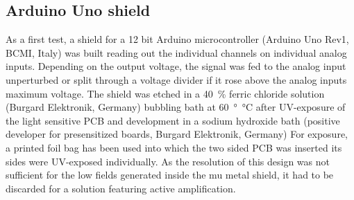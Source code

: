         \subsection{Arduino Uno shield}
        As a first test, a shield for a 12 bit Arduino microcontroller (Arduino Uno Rev1, BCMI, Italy) was built reading out the individual channels on individual analog inputs.  Depending on the output voltage, the signal was fed to the analog input unperturbed or split through a voltage divider if it rose above the analog inputs maximum voltage.  The shield was etched in a \SI{40}{\percent} ferric chloride solution  (Burgard Elektronik, Germany) bubbling bath at \SI{60}{\degree\celsius} after UV-exposure of the light sensitive PCB and development in a sodium hydroxide bath (positive developer for presensitized boards, Burgard Elektronik, Germany)  For exposure, a printed foil bag has been used into which the two sided PCB was inserted  its sides were UV-exposed individually.  As the resolution of this design was not sufficient for the low fields generated inside the mu metal shield, it had to be discarded for a solution featuring active amplification.
